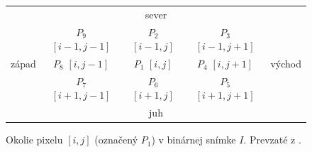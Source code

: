   \begin{figure}[h]
    \centering
      \begin{tabular}{ l | c | c | c | l }
        \multicolumn{5}{c}{sever} \\
        \cline{2-4}
        & \makecell{$P_9$ \\ $[i-1,j-1]$} & \makecell{$P_2$ \\ $[i-1,j]$} & \makecell{$P_3$ \\ $[i-1,j+1]$} \\ \cline{2-4}
        západ & \makecell{$P_8$ \\ $[i,j-1]$} & \makecell{$P_1$ \\ $[i,j]$} & \makecell{$P_4$ \\ $[i,j+1]$} & východ \\ \cline{2-4}
        & \makecell{$P_7$ \\ $[i+1,j-1]$} & \makecell{$P_6$ \\ $[i+1,j]$} & \makecell{$P_5$ \\ $[i+1,j+1]$} \\
        \cline{2-4}
        \multicolumn{5}{c}{juh}
      \end{tabular}
    \caption{Okolie pixelu $[i,j]$ (označený $P_1$) v binárnej snímke $I$. Prevzaté z \cite{ZhangSuen_thinning}.}
    \label{obr:okolie_ZhangSuen}
  \end{figure}

